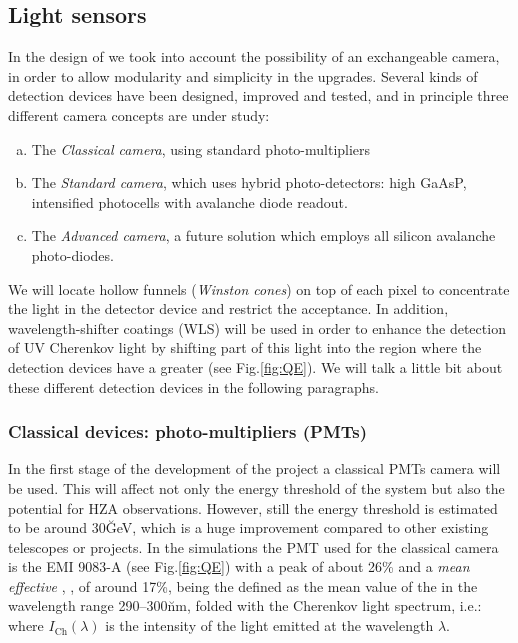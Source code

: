 \QuantumEfffig

\subsection{Light sensors}
%
In the design of \MAGIC we took into account the possibility of an
exchangeable camera, in order to allow modularity and simplicity in
the upgrades. Several kinds of detection devices have been designed,
improved and tested, and in principle three different camera concepts
are under study:
%
\begin{enumerate}[a.]
\item The \emph{Classical camera}, using standard photo-multipliers
%
\item The \emph{Standard camera}, which uses hybrid photo-detectors:
high \QE GaAsP, intensified photocells with avalanche diode readout.
%
\item The \emph{Advanced camera}, a future solution which employs all
silicon avalanche photo-diodes.
\end{enumerate}
%
We will locate hollow funnels (\emph{Winston cones}) on top of each
pixel to concentrate the light in the detector device and restrict the
acceptance. In addition, wavelength-shifter coatings (WLS) will be
used in order to enhance the detection of UV Cherenkov light by
shifting part of this light into the region where the detection
devices have a greater \QE (see Fig.\ref{fig:QE}). We will talk a
little bit about these different detection devices in the following
paragraphs.

\MAGICcamerafig

\pixelreadoutfig

\subsubsection{Classical devices: photo-multipliers (PMTs)}
%
In the first stage of the development of the project a classical PMTs
camera will be used. This will affect not only the energy threshold of
the system but also the potential for HZA observations. However, still
the energy threshold is estimated to be around 30\u{GeV}, which is a
huge improvement compared to other existing telescopes or projects. In
the simulations the PMT used for the classical camera is the EMI
9083-A (see Fig.\ref{fig:QE}) with a peak \QE of about 26\% and a
\emph{mean effective} \QE, \QEeff, of around 17\%, being the \QEeff
defined as the mean value of the \QE in the wavelength range
290--300\u{nm}, folded with the Cherenkov light spectrum, i.e.:
%
\meanQEdefeq
%
where $I_\mathrm{Ch}(\lambda)$ is the intensity of the \Cherenkov
light emitted at the wavelength $\lambda$.

